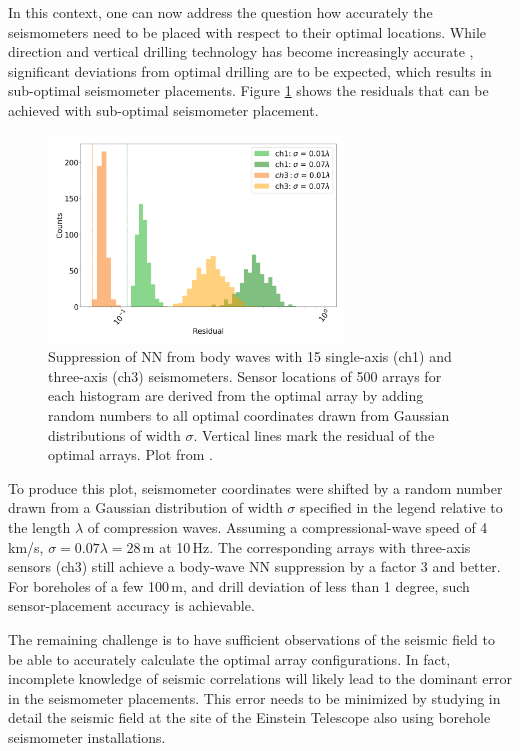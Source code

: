 In this context, one can now address the question how accurately the seismometers need to be placed with respect to their optimal locations. While direction and vertical drilling technology has become increasingly accurate \cite{MCZ2016}, significant deviations from optimal drilling are to be expected, which results in sub-optimal seismometer placements. Figure \ref{fig:errorNN} shows the residuals that can be achieved with sub-optimal seismometer placement. 
\begin{figure}[t!]
	\begin{center} 
		\includegraphics[width=0.7\textwidth]{SiteInfra/SiteRequirements/NewtonianNoise/NewtonianNoiseFigures/errorbody.png} 
		\caption{Suppression of NN from body waves with 15 single-axis (ch1) and three-axis (ch3) seismometers. Sensor locations of 500 arrays for each histogram are derived from the optimal array by adding random numbers to all optimal coordinates drawn from Gaussian distributions of width $\sigma$. Vertical lines mark the residual of the optimal arrays. Plot from \cite{BaHa2019}.} 
		 \label{fig:errorNN} 
	\end{center}
\end{figure}
To produce this plot, seismometer coordinates were shifted by a random number drawn from a Gaussian distribution of width $\sigma$ specified in the legend relative to the length $\lambda$ of compression waves. Assuming a compressional-wave speed of 4\,km/s, $\sigma=0.07\lambda=28\,$m at 10\,Hz. The corresponding arrays with three-axis sensors (ch3) still achieve a body-wave NN suppression by a factor 3 and better. For boreholes of a few 100\,m, and drill deviation of less than 1 degree, such sensor-placement accuracy is achievable. 

The remaining challenge is to have sufficient observations of the seismic field to be able to accurately calculate the optimal array configurations. In fact, incomplete knowledge of seismic correlations will likely lead to the dominant error in the seismometer placements. This error needs to be minimized by studying in detail the seismic field at the site of the Einstein Telescope also using borehole seismometer installations.
